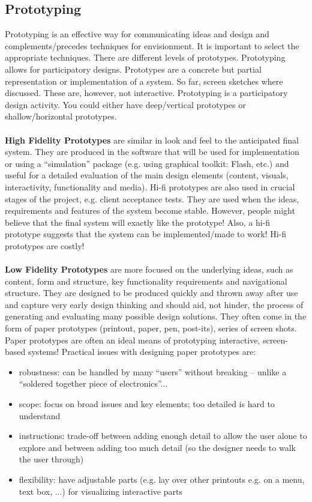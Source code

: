 \subsection{Prototyping}
Prototyping is an effective way for communicating ideas and design and complements/precedes techniques for envisionment. It is important to select the appropriate techniques. There are different levels of prototypes. Prototyping allows for participatory designs. Prototypes are a concrete but partial representation or implementation of a system. So far, screen sketches where discussed. These are, however, not interactive. Prototyping is a participatory design activity.
You could either have deep/vertical prototypes or shallow/horizontal prototypes.\\\\
\textbf{High Fidelity Prototypes} are  similar in look and feel to the anticipated final system. They are produced in the software that will be used for implementation or using a ``simulation'' package (e.g. using graphical toolkit: Flash, etc.) and useful for a detailed evaluation of the main design elements (content, visuals, interactivity, functionality and media). Hi-fi prototypes are also used in crucial stages of the project, e.g. client acceptance tests. They are used when the ideas, requirements and features of the system become stable. However, people might believe that the final system will exactly like the prototype! Also, a hi-fi prototype suggests that the system can be implemented/made to work! Hi-fi prototypes are costly!\\\\
\textbf{Low Fidelity Prototypes} are more focused on the underlying ideas, such as content, form and structure, key functionality requirements and navigational structure. They are designed to be produced quickly and thrown away after use and capture very early design thinking and should aid, not hinder, the process of generating and evaluating many possible design solutions. They often come in the form of paper prototypes (printout, paper, pen, post-its), series of screen shots. Paper prototypes are often an ideal means of prototyping interactive, screen-based systems!
Practical issues with designing paper prototypes are:
\begin{itemize}
\item robustness: can be handled by many ``users'' without breaking -- unlike a ``soldered together piece of electronics''...
\item scope: focus on broad issues and key elements; too detailed is hard to understand
\item instructions: trade-off between adding enough detail to allow the user alone to explore and between adding too much detail (so the designer needs to walk the user through)
\item flexibility: have adjustable parts (e.g. lay over other printouts e.g. on a menu, text box, ...) for visualizing interactive parts
\end{itemize}
